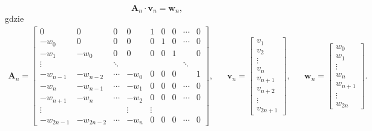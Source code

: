 \documentclass[paper=a4,DIV=12]{lpas}
\begin{document}
\begin{appendices}
  \begin{equation}
    \mathbf{A}_n \cdot \mathbf{v}_n = \mathbf{w}_n,
    \label{eq:7CL5I}
  \end{equation}
  gdzie
  \begin{equation}
    \begin{aligned}
      \mathbf{A}_n = \begin{bmatrix}
         0         & 0         & 0       & 0      & 1 &  0  & 0 & \cdots & 0 \\
         -w_0      & 0         & 0       & 0      & 0 &  1  & 0 & \cdots & 0 \\
         -w_1      & -w_0      & 0       & 0      & 0 &  0  & 1 &        & 0 \\
         \vdots    &           & \ddots  &        &   &     &   & \ddots &   \\
         -w_{n-1}  & -w_{n-2}  & \cdots  & -w_0   & 0 &  0  & 0 &        & 1 \\
         -w_{n}    & -w_{n-1}  & \cdots  & -w_1   & 0 &  0  & 0 & \cdots & 0 \\
         -w_{n+1}  & -w_{n}    & \cdots  & -w_2   & 0 &  0  & 0 & \cdots & 0 \\
         \vdots    &           &         & \vdots & \vdots & &  &        &   \\
         -w_{2n-1} & -w_{2n-2} & \cdots  & -w_n   & 0 &  0  & 0 & \cdots & 0
      \end{bmatrix}, &
      & \mathbf{v}_n = \begin{bmatrix}
        v_1 \\ v_2 \\ \vdots \\ v_n \\
        v_{n+1} \\ v_{n+2} \\ \vdots \\ v_{2n+1}
      \end{bmatrix}, &
      & \mathbf{w}_n = \begin{bmatrix}
        w_0 \\ w_1 \\ \vdots \\ w_n \\ w_{n+1} \\ \vdots \\ w_{2n}
      \end{bmatrix}. &
    \end{aligned}
    \label{eq:VR42H}
  \end{equation}


\end{appendices}
\end{document}
